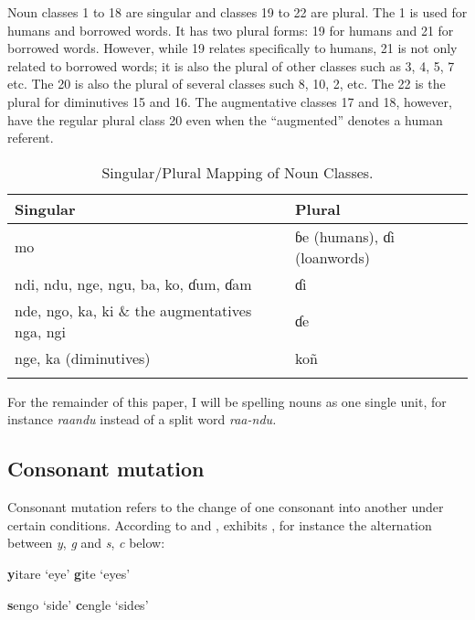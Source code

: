 \documentclass[output=paper,
modfonts
]{langscibook}
\begin{document}
Noun classes 1 to 18 are singular and  classes 19 to 22 are plural. The  1 is used for humans and borrowed words. It has two plural forms: 19 for humans and 21 for borrowed words. However, while 19 relates specifically to humans, 21 is not only related to borrowed words; it is also the plural of other  classes such as 3, 4, 5, 7 etc. The  20 is also the plural of several  classes such 8, 10, 2, etc. The  22 is the plural for diminutives 15 and 16. The augmentative classes 17 and 18, however, have the regular plural class 20 even when the “augmented”  denotes a human referent. 


\begin{table}
\begin{tabular}{ll}
\lsptoprule
{ {Singular}} & { {Plural}}\\\midrule
{ mo} & { ɓe (humans), ɗi (loanwords)}\\
{ ndi, ndu, nge, ngu, ba, ko, ɗum, ɗam} & { ɗi}\\
{ nde, ngo, ka, ki \& the augmentatives nga, ngi} & { ɗe}\\
{ nge, ka (diminutives)} & { koñ}\\
\lspbottomrule
\end{tabular}
\caption{Singular/Plural Mapping of Noun Classes.}
\label{tab:ba:2}
\end{table}


For the remainder of this paper, I will be spelling nouns as one single unit, for instance \textit{raandu} instead of a split word \textit{raa-ndu.}

 
\subsection{Consonant mutation}\label{sec:ba:2.3}
 
Consonant mutation refers to the change of one consonant into another under certain conditions. According to \citet{Sylla1982} and \citet{McLaughlin2005},  exhibits , for instance the alternation between \textit{y}, \textit{g} and \textit{s}, \textit{c} below: 

\ea\label{ex:ba:10}
\ea
 \textbf{y}itare        ‘eye’
\ex  \textbf{g}ite           ‘eyes’
\z
\z

\ea
\ea
\textbf{s}engo        ‘side’
\ex  \textbf{c}engle      ‘sides’ 
\z
\z
\end{document}
